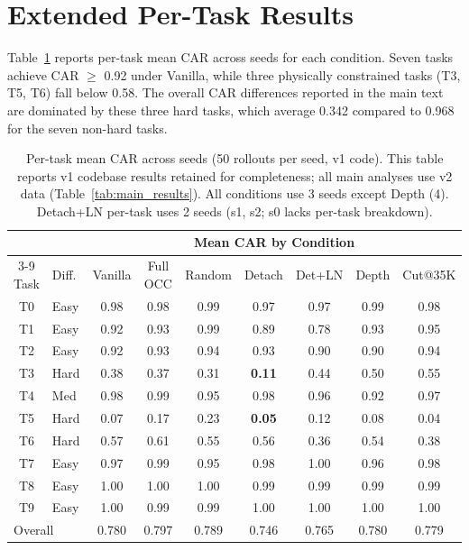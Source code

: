 
\section{Extended Per-Task Results}
\label{app:per_task}

Table~\ref{tab:per_task} reports per-task mean CAR across seeds for each condition. Seven tasks achieve CAR $\geq$ 0.92 under Vanilla, while three physically constrained tasks (T3, T5, T6) fall below 0.58. The overall CAR differences reported in the main text are dominated by these three hard tasks, which average 0.342 compared to 0.968 for the seven non-hard tasks.

\begin{table}[h]
\centering
\caption{Per-task mean CAR across seeds (50 rollouts per seed, v1 code). This table reports v1 codebase results retained for completeness; all main analyses use v2 data (Table~\ref{tab:main_results}). All conditions use 3 seeds except Depth (4). Detach+LN per-task uses 2 seeds (s1, s2; s0 lacks per-task breakdown).}
\label{tab:per_task}
\begin{tabular}{clccccccc}
\toprule
 & & \multicolumn{7}{c}{Mean CAR by Condition} \\
\cmidrule(lr){3-9}
Task & Diff. & Vanilla & Full OCC & Random & Detach & Det+LN & Depth & Cut@35K \\
\midrule
T0 & Easy  & 0.98 & 0.98 & 0.99 & 0.97 & 0.97 & 0.99 & 0.98 \\
T1 & Easy  & 0.92 & 0.93 & 0.99 & 0.89 & 0.78 & 0.93 & 0.95 \\
T2 & Easy  & 0.92 & 0.93 & 0.94 & 0.93 & 0.90 & 0.90 & 0.94 \\
T3 & Hard  & 0.38 & 0.37 & 0.31 & \textbf{0.11} & 0.44 & 0.50 & 0.55 \\
T4 & Med   & 0.98 & 0.99 & 0.95 & 0.98 & 0.96 & 0.92 & 0.97 \\
T5 & Hard  & 0.07 & 0.17 & 0.23 & \textbf{0.05} & 0.12 & 0.08 & 0.04 \\
T6 & Hard  & 0.57 & 0.61 & 0.55 & 0.56 & 0.36 & 0.54 & 0.38 \\
T7 & Easy  & 0.97 & 0.99 & 0.95 & 0.98 & 1.00 & 0.96 & 0.98 \\
T8 & Easy  & 1.00 & 1.00 & 1.00 & 0.99 & 0.99 & 0.99 & 0.99 \\
T9 & Easy  & 1.00 & 0.99 & 0.99 & 1.00 & 1.00 & 1.00 & 1.00 \\
\midrule
\multicolumn{2}{l}{Overall} & 0.780 & 0.797 & 0.789 & 0.746 & 0.765 & 0.780 & 0.779 \\
\bottomrule
\end{tabular}
\end{table}

